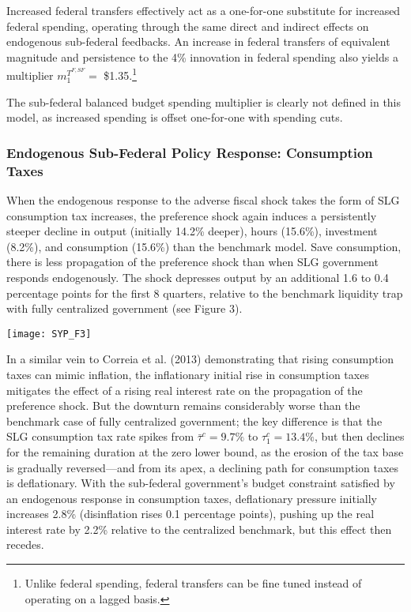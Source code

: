 \documentclass[12pt,letterpaper]{article}
\begin{document}
Increased federal transfers effectively act as a one-for-one substitute for increased federal spending, operating through the same direct and indirect effects on endogenous sub-federal feedbacks. An increase in federal transfers of equivalent magnitude and persistence to the 4\% innovation in federal  spending also yields a multiplier $m^{T^{F,SF}}_1 = $ \$1.35.\footnote{Unlike federal spending, federal transfers can be fine tuned instead of operating on a lagged basis.} 

The sub-federal balanced budget spending multiplier is clearly not defined in this model, as increased spending is offset one-for-one with spending cuts. \bigskip

\subsubsection{Endogenous Sub-Federal Policy Response: Consumption Taxes}
When the endogenous response to the adverse fiscal shock takes the form of SLG consumption tax increases, the preference shock again induces a persistently steeper decline in output (initially 14.2\% deeper), hours (15.6\%), investment (8.2\%), and consumption (15.6\%) than the benchmark model. Save consumption, there is less propagation of the preference shock than when SLG government responds endogenously. The shock depresses output by an additional 1.6 to 0.4 percentage points for the first 8 quarters, relative to the benchmark liquidity trap with fully centralized government (see Figure 3). 

\begin{center}
\texttt{[image: SYP\_F3]}
\end{center}

In a similar vein to Correia et al. (2013) demonstrating that rising consumption taxes can mimic inflation, the inflationary initial rise in consumption taxes mitigates the effect of a rising real interest rate on the propagation of the preference shock. But the downturn remains considerably worse than the benchmark case of fully centralized government; the key difference is that the SLG consumption tax rate spikes from $\bar{\tau}^c = 9.7\%$ to $\tau^c_1 = 13.4\%$, but then declines for the remaining duration at the zero lower bound, as the erosion of the tax base is gradually reversed---and from its apex, a declining path for consumption taxes is deflationary. With the sub-federal government's budget constraint satisfied by an endogenous response in consumption taxes, deflationary pressure initially increases 2.8\% (disinflation rises 0.1 percentage points), pushing up the real interest rate by 2.2\% relative to the centralized benchmark, but this effect then recedes. 
\end{document}
